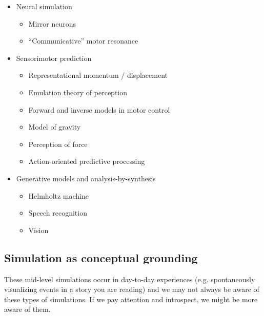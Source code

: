 \documentclass[12pt]{article}
\begin{document}
\begin{itemize}
\item Neural simulation
    \begin{itemize}
    \item Mirror neurons \citep{Gallese1998}
    \item ``Communicative'' motor resonance \citep{Fischer2008}
    \end{itemize}
\item Sensorimotor prediction
    \begin{itemize}
    \item Representational momentum / displacement \citep{Freyd1984,Freyd1988,Hubbard2005}
    \item Emulation theory of perception \citep{Grush2004}
    \item Forward and inverse models in motor control \citep{Kawato1999,Flanagan2003}
    \item Model of gravity \citep{Zago2005}
    \item Perception of force \citep{White2012a}
    \item Action-oriented predictive processing \citep{Clark2013}
    \end{itemize}
\item Generative models and analysis-by-synthesis
    \begin{itemize}
    \item Helmholtz machine \citep{Helmholtz1925,Dayan1995}
    \item Speech recognition \citep{Halle1962,Halle1959,Bever2010}
    \item Vision \citep{Yuille2006}
    \end{itemize}
\end{itemize}

\subsection*{Simulation as conceptual grounding}

These mid-level simulations occur in day-to-day experiences (e.g. spontaneously visualizing events in a story you are reading) and we may not always be aware of these types of simulations. If we pay attention and introspect, we might be more aware of them.
\end{document}
